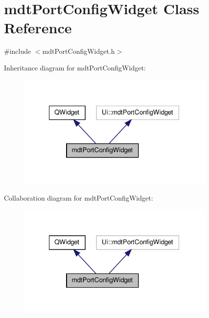 \hypertarget{classmdt_port_config_widget}{\section{mdt\-Port\-Config\-Widget Class Reference}
\label{classmdt_port_config_widget}
}


{\ttfamily \#include $<$mdt\-Port\-Config\-Widget.\-h$>$}



Inheritance diagram for mdt\-Port\-Config\-Widget\-:
\nopagebreak
\begin{figure}[H]
\begin{center}
\leavevmode
\includegraphics[width=278pt]{classmdt_port_config_widget__inherit__graph}
\end{center}
\end{figure}


Collaboration diagram for mdt\-Port\-Config\-Widget\-:
\nopagebreak
\begin{figure}[H]
\begin{center}
\leavevmode
\includegraphics[width=278pt]{classmdt_port_config_widget__coll__graph}
\end{center}
\end{figure}
